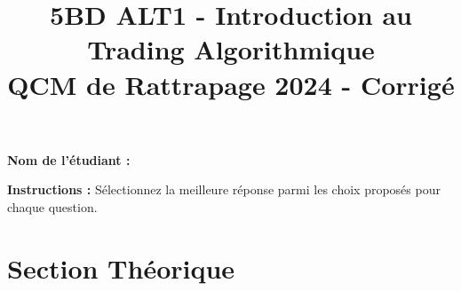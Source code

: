 \documentclass[a4paper,12pt]{article}
\title{5BD ALT1 - Introduction au Trading Algorithmique \\ \textbf{QCM de Rattrapage 2024 - Corrigé}}
\author{}
\date{}
\begin{document}
\maketitle

\vspace{1cm}

\textbf{Nom de l'étudiant :} \underline{\hspace{10cm}}

\vspace{1cm}

\textbf{Instructions :} Sélectionnez la meilleure réponse parmi les choix proposés pour chaque question.

\vspace{0.5cm}

\section*{Section Théorique}
\end{document}
